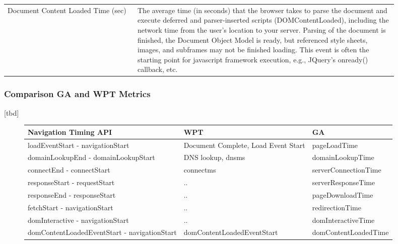 \begin{center}
\begin{tabular}{ p{0.3\linewidth} | p{0.6\linewidth} }
	Document Content Loaded Time (sec) & The average time (in seconds) that the browser takes to parse the document and execute deferred and parser-inserted scripts (DOMContentLoaded), including the network time from the user's location to your server. Parsing of the document is finished, the Document Object Model is ready, but referenced style sheets, images, and subframes may not be finished loading. This event is often the starting point for javascript framework execution, e.g., JQuery's onready() callback, etc.  \\
	\end{tabular}
\end{center}






\subsubsection{Comparison GA and WPT Metrics}

[tbd]




\begin{sidewaysfigure}

\begin{center}
	\begin{tabular}{ l | l | l }
	Navigation Timing API & WPT & GA \\ 
	\hline
	loadEventStart - navigationStart & Document Complete, Load Event Start & pageLoadTime \\
	domainLookupEnd - domainLookupStart & DNS lookup, dns\textunderscore ms & domainLookupTime \\
	connectEnd - connectStart & connect\textunderscore ms & serverConnectionTime \\
	responseStart - requestStart & .. & serverResponseTime \\
	responseEnd - responseStart & .. & pageDownloadTime \\
	fetchStart - navigationStart & .. & redirectionTime \\
	domInteractive - navigationStart & .. & domInteractiveTime \\
	domContentLoadedEventStart - navigationStart & domContentLoadedEventStart & domContentLoadedTime \\
	\end{tabular}
\end{center}


\end{sidewaysfigure}





